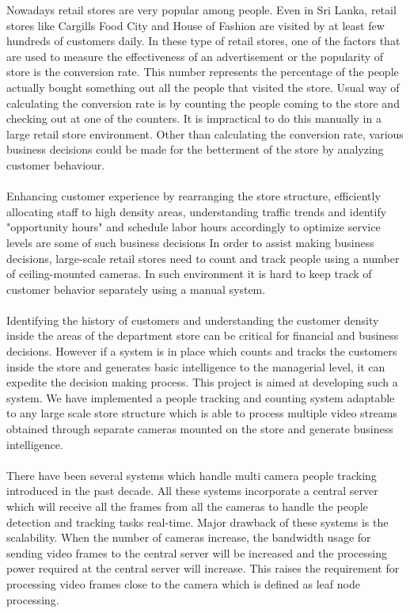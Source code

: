 \documentclass[12pt,a4paper]{report}
\begin{document}
Nowadays retail stores are very popular among people. Even in Sri Lanka, retail stores like Cargills Food City and House of Fashion are visited by at least few hundreds of customers daily. In these type of retail stores, one of the factors that are used to measure the effectiveness of an advertisement or the popularity of store is the conversion rate. This number represents the percentage of the people actually bought something out all the people that visited the store. Usual way of calculating the conversion rate is by counting the people coming to the store and checking out at one of the counters. It is impractical to do this manually in a large retail store environment. Other than calculating the conversion rate, various business decisions could be made for the betterment of the store by analyzing customer behaviour. \\\\
Enhancing customer experience by rearranging the store structure, efficiently allocating staff to high density areas, understanding traffic trends and identify "opportunity hours" and schedule labor hours accordingly to optimize service levels are some of such business decisions In order to assist making business decisions, large-scale retail stores need to count and track people using a number of ceiling-mounted cameras. In such environment it is hard to keep track of customer behavior separately using a manual system.\\\\
Identifying the history of  customers and understanding the customer density inside the areas of the department store can be critical for financial and business decisions. However if a system is in place which counts and tracks the customers inside the store and generates basic intelligence to the managerial level, it can expedite the decision making process. This project is aimed at developing such a system. We have implemented a people tracking and counting system adaptable to any large scale store structure which is able to process multiple video streams obtained through separate cameras mounted on the store and generate business intelligence.\\\\
There have been several systems which handle multi camera people tracking introduced in the past decade. All these systems incorporate a central server which will receive all the frames from all the cameras to handle the people detection and tracking tasks real-time. Major drawback of these systems is the scalability. When the number of cameras increase, the bandwidth usage for sending video frames to the central server will be increased and the processing power required at the central server will increase. This raises the requirement for processing video frames close to the camera which is defined as leaf node processing. \\\\
\end{document}
